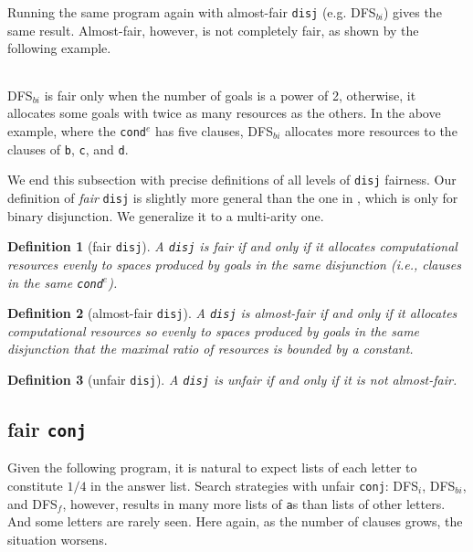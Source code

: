 \documentclass[format=acmlarge, review=true, authordraft=true]{acmart}
\newcommand{\conde}{\texttt{cond$^e$}}
\newcommand{\conj}{\texttt{conj}}
\newcommand{\disj}{\texttt{disj}}
\newcommand{\DFSi }[0]{DFS$_{i}$}
\newcommand{\DFSf }[0]{DFS$_{f}$}
\newcommand{\DFSbi}[0]{DFS$_{bi}$}
\newtheorem{defn}{Definition}[section]
\begin{document}
Running the same program again with almost-fair \disj {} (e.g. 
\DFSbi{}) gives the same result. Almost-fair, however, is not 
completely fair, as shown by the following example. 

\begin{center}
	\begin{tabular}{c}
		
	\end{tabular}
\end{center}

\DFSbi{} is fair only when the number of goals is a power of 2, 
otherwise, it allocates some goals with twice as many resources as the 
others. In the above example, where the \conde{} has five clauses, \DFSbi{} 
allocates more resources to the clauses of \texttt{b}, \texttt{c}, and 
\texttt{d}.

We end this subsection with precise definitions of all levels of 
\disj{} fairness. Our definition of \emph{fair} \disj{} is slightly 
more general
than the one in \citet{seres1999algebra}, which is only
for binary disjunction. We generalize it to a multi-arity one.

\begin{defn}[fair \disj{}]
A \disj{} is fair if and only if it allocates computational resources evenly to 
spaces produced by goals in the same disjunction 
(i.e., clauses in the same \conde).
\end{defn}

\begin{defn}[almost-fair \disj{}]
A \disj{} is almost-fair if and only if it allocates computational resources
so evenly to spaces produced by goals in the same disjunction that 
the maximal ratio of resources is bounded by a constant.
\end{defn}

\begin{defn}[unfair \disj{}]
A \disj{} is unfair if and only if it is not almost-fair.
\end{defn}

\subsection{fair \texttt{conj}}
\label{sec:fairconj}

Given the following program, it is natural to expect lists of each letter to
constitute $1/4$ in the answer list. Search strategies with unfair \conj{}:
\DFSi, \DFSbi, and \DFSf, however, results in many more lists of \texttt{a}s 
than 
lists of other letters. And some letters are rarely seen. Here again, as the
number of clauses grows, the situation worsens. 
\end{document}
